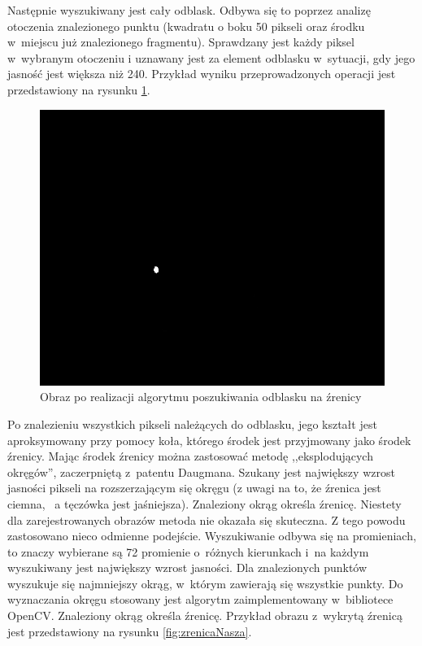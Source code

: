 Następnie wyszukiwany jest cały odblask. Odbywa się to poprzez analizę otoczenia znalezionego punktu (kwadratu o boku 50 pikseli oraz środku w~miejscu już znalezionego fragmentu). Sprawdzany jest każdy piksel w~wybranym otoczeniu i uznawany jest za element odblasku w~sytuacji, gdy jego jasność jest większa niż 240. Przykład wyniku przeprowadzonych operacji jest przedstawiony na rysunku \ref{fig:dobryOdblask}.

\begin{figure}
\begin{center}
\includegraphics[scale=0.5]{odblask.jpg}
\caption{Obraz po realizacji algorytmu poszukiwania odblasku na źrenicy}
\label{fig:dobryOdblask}
\end{center}
\end{figure}

Po znalezieniu wszystkich pikseli należących do odblasku, jego kształt jest aproksymowany przy pomocy koła, którego środek jest przyjmowany jako środek źrenicy. Mając środek źrenicy można zastosować metodę ,,eksplodujących okręgów'', zaczerpniętą z~patentu Daugmana.  Szukany jest największy wzrost jasności pikseli na rozszerzającym się okręgu (z uwagi na to, że źrenica jest ciemna, ~a tęczówka jest jaśniejsza). Znaleziony okrąg określa źrenicę. Niestety dla zarejestrowanych obrazów metoda nie okazała się skuteczna. Z tego powodu zastosowano nieco odmienne podejście. Wyszukiwanie odbywa się na promieniach, to znaczy wybierane są 72 promienie o~różnych kierunkach i~na każdym wyszukiwany jest największy wzrost jasności. Dla znalezionych punktów wyszukuje się najmniejszy okrąg, w~którym zawierają się wszystkie punkty. Do wyznaczania okręgu stosowany jest algorytm zaimplementowany w~bibliotece OpenCV. Znaleziony okrąg określa źrenicę. Przykład obrazu z~wykrytą źrenicą jest przedstawiony na rysunku \ref{fig:zrenicaNasza}.

